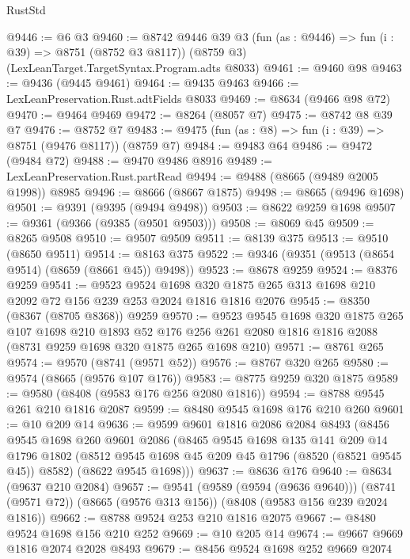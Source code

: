 \begin{lexlean}{RustStd}
\begin{coremodule}
@9446 := @6 @3
@9460 := @8742
    @9446
    @39
    @3
    (fun (as : @9446) => fun (i : @39) => @8751 (@8752 @3 @8117))
    (@8759 @3)
    (LexLeanTarget.TargetSyntax.Program.adts @8033)
@9461 := @9460 @98
@9463 := @9436 (@9445 @9461)
@9464 := @9435 @9463
@9466 := LexLeanPreservation.Rust.adtFields @8033
@9469 := @8634 (@9466 @98 @72)
@9470 := @9464 @9469
@9472 := @8264 (@8057 @7)
@9475 := @8742 @8 @39 @7
@9476 := @8752 @7
@9483 := @9475 (fun (as : @8) => fun (i : @39) => @8751 (@9476 @8117)) (@8759 @7)
@9484 := @9483 @64
@9486 := @9472 (@9484 @72)
@9488 := @9470 @9486 @8916
@9489 := LexLeanPreservation.Rust.partRead
@9494 := @9488 (@8665 (@9489 @2005 @1998)) @8985
@9496 := @8666 (@8667 @1875)
@9498 := @8665 (@9496 @1698)
@9501 := @9391 (@9395 (@9494 @9498))
@9503 := @8622 @9259 @1698
@9507 := @9361 (@9366 (@9385 (@9501 @9503)))
@9508 := @8069 @45
@9509 := @8265 @9508
@9510 := @9507 @9509
@9511 := @8139 @375
@9513 := @9510 (@8650 @9511)
@9514 := @8163 @375
@9522 := @9346 (@9351 (@9513 (@8654 @9514) (@8659 (@8661 @45)) @9498))
@9523 := @8678 @9259
@9524 := @8376 @9259
@9541 := @9523
    @9524
    @1698
    @320
    @1875
    @265
    @313
    @1698
    @210
    @2092
    @72
    @156
    @239
    @253
    @2024
    @1816
    @1816
    @2076
@9545 := @8350 (@8367 (@8705 @8368)) @9259
@9570 := @9523
    @9545
    @1698
    @320
    @1875
    @265
    @107
    @1698
    @210
    @1893
    @52
    @176
    @256
    @261
    @2080
    @1816
    @1816
    @2088
    (@8731 @9259 @1698 @320 @1875 @265 @1698 @210)
@9571 := @8761 @265
@9574 := @9570 (@8741 (@9571 @52))
@9576 := @8767 @320 @265
@9580 := @9574 (@8665 (@9576 @107 @176))
@9583 := @8775 @9259 @320 @1875
@9589 := @9580 (@8408 (@9583 @176 @256 @2080 @1816))
@9594 := @8788 @9545 @261 @210 @1816 @2087
@9599 := @8480 @9545 @1698 @176 @210 @260
@9601 := @10 @209 @14
@9636 := @9599
    @9601
    @1816
    @2086
    @2084
    @8493
    (@8456
      @9545
      @1698
      @260
      @9601
      @2086
      (@8465
        @9545
        @1698
        @135
        @141
        @209
        @14
        @1796
        @1802
        (@8512 @9545 @1698 @45 @209 @45 @1796 (@8520 (@8521 @9545 @45)) @8582)
        (@8622 @9545 @1698)))
@9637 := @8636 @176
@9640 := @8634 (@9637 @210 @2084)
@9657 := @9541
    (@9589 (@9594 (@9636 @9640)))
    (@8741 (@9571 @72))
    (@8665 (@9576 @313 @156))
    (@8408 (@9583 @156 @239 @2024 @1816))
@9662 := @8788 @9524 @253 @210 @1816 @2075
@9667 := @8480 @9524 @1698 @156 @210 @252
@9669 := @10 @205 @14
@9674 := @9667 @9669 @1816 @2074 @2028 @8493
@9679 := @8456 @9524 @1698 @252 @9669 @2074

\end{coremodule}
\end{lexlean}
